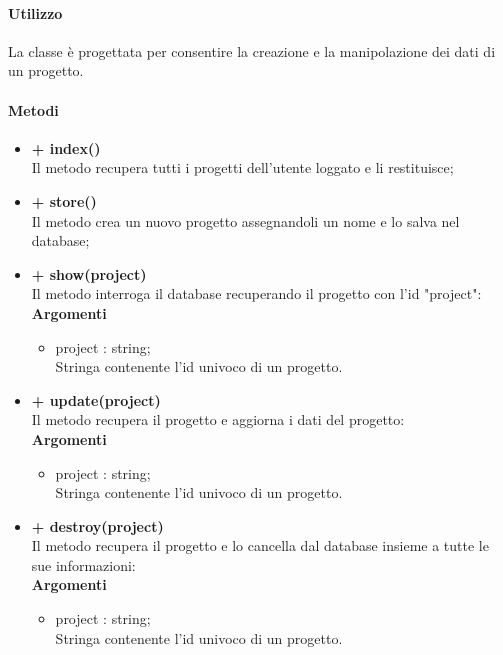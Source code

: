	\paragraph{Utilizzo}
		La classe è progettata per consentire la creazione e la manipolazione dei dati di un progetto.
		
	\paragraph{Metodi}
		\begin{itemize}
			\item \textbf{+ index()}\\
			Il metodo recupera tutti i progetti dell'utente loggato e li restituisce;
			\item \textbf{+ store()}\\
			Il metodo crea un nuovo progetto assegnandoli un nome e lo salva nel database;
			\item \textbf{+ show(project)}\\
			Il metodo interroga il database recuperando il progetto con l'id "project":\\
			\textbf{Argomenti}
			\begin{itemize}
				\item project : string; \\
				Stringa contenente l'id univoco di un progetto.
			\end{itemize}
			\item \textbf{+ update(project)}\\
			Il metodo recupera il progetto e aggiorna i dati del progetto:\\
			\textbf{Argomenti}
			\begin{itemize}
				\item project : string; \\
				Stringa contenente l'id univoco di un progetto.
			\end{itemize}
			\item \textbf{+ destroy(project)}\\
			Il metodo recupera il progetto e lo cancella dal database insieme a tutte le  sue informazioni:\\
			\textbf{Argomenti}
			\begin{itemize}
				\item project : string; \\
				Stringa contenente l'id univoco di un progetto.
			\end{itemize}
		\end{itemize}
		
